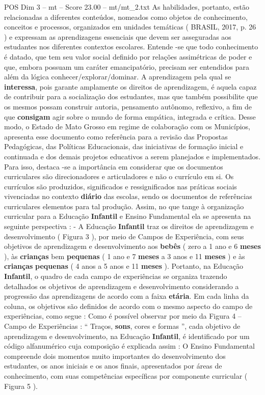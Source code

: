 \begin{textsample}{POS Dim 3 – mt – Score 23.00 – mt/mt\_2.txt}
As habilidades, portanto, estão relacionadas a diferentes conteúdos, nomeados como objetos de conhecimento, conceitos e processos, organizados em unidades temáticas ( BRASIL, 2017, p. 26 ) e expressam as aprendizagens essenciais que devem ser asseguradas aos estudantes nos diferentes contextos escolares.
Entende -se que todo conhecimento é datado, que tem seu valor social definido por relações assimétricas de poder e que, embora possuam um caráter emancipatório, precisam ser entendidos para além da lógica conhecer/explorar/dominar.
A aprendizagem pela qual se \textbf{interessa}, pois garante amplamente os direitos de aprendizagem, é aquela capaz de contribuir para a socialização dos estudantes, mas que também possibilite que os mesmos possam construir autoria, pensamento autônomo, reflexivo, a fim de que \textbf{consigam} agir sobre o mundo de forma empática, integrada e crítica.
Desse modo, o Estado de Mato Grosso em regime de colaboração com os Municípios, apresenta esse documento como referência para a revisão das Propostas Pedagógicas, das Políticas Educacionais, das iniciativas de formação inicial e continuada e dos demais projetos educativos a serem planejados e implementados.
Para isso, destaca -se a importância em considerar que os documentos curriculares são direcionadores e articuladores e não o currículo em si.
Os currículos são produzidos, significados e ressignificados nas práticas sociais vivenciadas no contexto \textbf{diário} das escolas, sendo os documentos de referências curriculares elementos para tal produção.
Assim, no que tange à organização curricular para a Educação \textbf{Infantil} e Ensino Fundamental ela se apresenta na seguinte perspectiva : - A Educação \textbf{Infantil} traz os direitos de aprendizagem e desenvolvimento ( Figura 3 ), por meio de Campos de Experiência, com seus objetivos de aprendizagem e desenvolvimento aos \textbf{bebês} ( zero a 1 ano e 6 \textbf{meses} ), às \textbf{crianças} bem \textbf{pequenas} ( 1 ano e 7 \textbf{meses} a 3 anos e 11 \textbf{meses} ) e às \textbf{crianças} \textbf{pequenas} ( 4 anos a 5 anos e 11 \textbf{meses} ).
Portanto, na Educação \textbf{Infantil}, o quadro de cada campo de experiências se organiza trazendo detalhados os objetivos de aprendizagem e desenvolvimento considerando a progressão das aprendizagens de acordo com a faixa \textbf{etária}.
Em cada linha da coluna, os objetivos são definidos de acordo com o mesmo aspecto do campo de experiências, como segue : Como é possível observar por meio da Figura 4 – Campo de Experiências : “ Traços, \textbf{sons}, cores e formas ”, cada objetivo de aprendizagem e desenvolvimento, na Educação \textbf{Infantil}, é identificado por um código alfanumérico cuja composição é explicada assim : O Ensino Fundamental compreende dois momentos muito importantes do desenvolvimento dos estudantes, os anos iniciais e os anos finais, apresentados por áreas de conhecimento, com suas competências específicas por componente curricular ( Figura 5 ).

\end{textsample}
